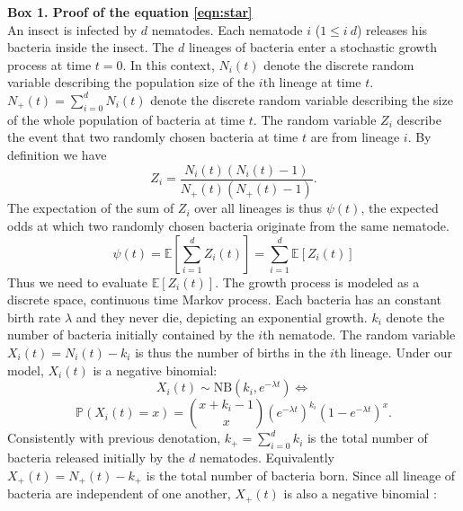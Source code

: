 \documentclass[10pt]{article}
\newcommand{\pr}{{\mathbb{P}}}
\begin{document}
\begin{boxframe}
\label{box_psi_simultaneous}
\begin{multicols}{2}
\textbf{Box 1. Proof of the equation \eqref{eqn:star}\\}
An insect is infected by $d$ nematodes. Each nematode $i$ ($ 1 \leq i \ d$) releases his bacteria inside the insect. The $d$ lineages of bacteria enter a stochastic growth process at time $t=0$.
In this context, $N_i(t)$ denote the discrete random variable describing the population size of the $i$th lineage at time $t$. $N_+(t)=\sum_{i=0}^d N_i(t)$ denote the discrete random variable describing the size of the whole population of bacteria at time $t$. The random variable $Z_i$ describe the event that two randomly chosen bacteria at time $t$ are from lineage $i$. By definition we have
\begin{equation}
Z_i=\dfrac{N_i(t)(N_i(t)-1)}{N_+(t)( N_+(t)-1 ) }.
\end{equation} 
The expectation of the sum of $Z_i$ over all lineages is thus $\psi (t)$, the expected odds 
at which two randomly chosen bacteria originate from the same nematode. 
\begin{equation}
\psi(t) = \mathbb{E} \left[ \sum_{i=1}^d Z_i(t) \right] = \sum_{i=1}^d \mathbb{E}[ Z_i(t)]
\end{equation}
Thus we need to evaluate $\mathbb{E}[ Z_i(t)]$. 
The growth process is modeled as a discrete space, continuous time Markov process. Each bacteria has an constant birth rate $\lambda$ and they never die, depicting an exponential growth. 
$k_i$ denote the number of bacteria initially contained by the $i$th nematode. The random variable $X_i(t)=N_i(t)-k_i$ is thus the number of births in the $i$th lineage. Under our model, 
$X_i(t)$ is a negative binomial\cite[p. 158]{cox1977theory}:
\begin{equation}
X_i(t) \sim \mathrm{NB} \left( k_i, e^{-\lambda t} \right) \iff
\end{equation}
\begin{equation}
\pr(X_i(t)=x)=\binom{x+k_i -1}{x} \left( e^{-\lambda t} \right)^{k_i} \left( 1-e^{-\lambda t} \right)^{x}.
\end{equation}
Consistently with previous denotation, $k_+=\sum_{i=0}^d k_i$ is the total number of bacteria released initially by the $d$ nematodes. Equivalently $X_+(t)=N_+(t)-k_+$ is the total number of bacteria born. Since all lineage of bacteria are independent of one another, $X_+(t)$ is also a negative binomial \cite{johnson2005univariate}:
\begin{equation}

\end{equation}
\end{multicols}
\end{boxframe}
\end{document}
